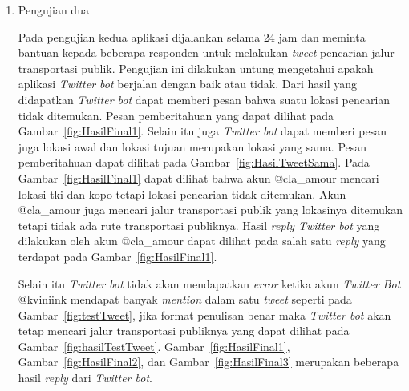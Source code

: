 \begin{enumerate}
	Lalu pencarian kedua pada \textit{website} KIRI dilakukan dengan lokasi awal yaitu PVJ dan lokasi tujuan yaitu Museum KAA. Hasil pencarian KIRI dari PVJ menuju Museum KAA dapat dilihat pada Gambar~\ref{fig:HasilKiri2}. Setelah dilihat dari hasil keduanya, \textit{Twitter bot} melakukan \textit{duplicate tweet} pada \textit{tweet} pertama dalam pencarian ke dua yang dilakukan oleh akun @kviniink123. \textit{Duplicate tweet} adalah \textit{tweet} yang dinyatakan dinyatakan identik oleh Twitter dalam jangka waktu tertentu. \textit{Duplicate tweet} tidak diperbolehkan oleh Twitter. Oleh karena itu, untuk menghindari adanya \textit{duplicate tweet}, penulis menambahkan waktu untuk jam, menit, dan detik di setiap \textit{tweet} yang dilakukan oleh \textit{Twitter bot} agar membuat setiap \textit{tweet} tersebut bersifat unik.
	
	\begin{figure}
		\centering
			\texttt{[image: C:/Skripsi/doc/DokumenSkripsi/Gambar/HasilKiri2.PNG]}
		\caption{Hasil Pencarian Jalur Transportasi Publik dari BIP menuju PVJ Melalui Website KIRI}
		\label{fig:HasilKiri2}
	\end{figure}
	\clearpage
	
	\item Pengujian dua
	
	Pada pengujian kedua aplikasi dijalankan selama 24 jam dan meminta bantuan kepada beberapa responden untuk melakukan \textit{tweet} pencarian jalur transportasi publik. Pengujian ini dilakukan untung mengetahui apakah aplikasi \textit{Twitter bot} berjalan dengan baik atau tidak. Dari hasil yang didapatkan \textit{Twitter bot} dapat memberi pesan bahwa suatu lokasi pencarian tidak ditemukan. Pesan pemberitahuan yang dapat dilihat pada Gambar~\ref{fig:HasilFinal1}. Selain itu juga \textit{Twitter bot} dapat memberi pesan juga lokasi awal dan lokasi tujuan merupakan lokasi yang sama. Pesan pemberitahuan dapat dilihat pada Gambar~\ref{fig:HasilTweetSama}.
	Pada Gambar~\ref{fig:HasilFinal1} dapat dilihat bahwa akun @cla\_amour mencari lokasi tki dan kopo tetapi lokasi pencarian tidak ditemukan. Akun @cla\_amour juga mencari jalur transportasi publik yang lokasinya ditemukan tetapi tidak ada rute transportasi publiknya. Hasil \textit{reply Twitter bot} yang dilakukan oleh akun @cla\_amour dapat dilihat pada salah satu \textit{reply} yang terdapat pada Gambar~\ref{fig:HasilFinal1}.
	
	Selain itu \textit{Twitter bot} tidak akan mendapatkan \textit{error} ketika akun \textit{Twitter Bot} @kviniink mendapat banyak \textit{mention} dalam satu \textit{tweet} seperti pada Gambar~\ref{fig:testTweet}, jika format penulisan benar maka \textit{Twitter bot} akan tetap mencari jalur transportasi publiknya yang dapat dilihat pada Gambar~\ref{fig:hasilTestTweet}. 
	Gambar~\ref{fig:HasilFinal1}, Gambar~\ref{fig:HasilFinal2}, dan Gambar~\ref{fig:HasilFinal3} merupakan beberapa hasil \textit{reply} dari \textit{Twitter bot}.
	

\end{enumerate}
